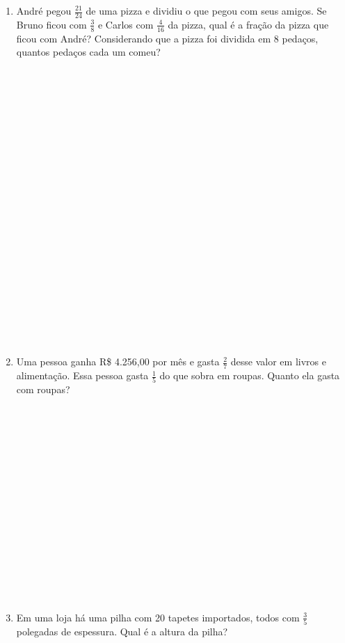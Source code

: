\documentclass[a4paper,14pt]{article}
\begin{document}
\begin{multicols}{2}
\begin{enumerate}
    		\item André pegou $\frac{21}{24}$ de uma pizza e dividiu o que pegou com seus amigos. Se Bruno ficou com $\frac{3}{8}$ e Carlos com $\frac{4}{16}$ da pizza, qual é a fração da pizza que ficou com André? Considerando que a pizza foi dividida em 8 pedaços, quantos pedaços cada um comeu? \\\\\\\\\\\\\\\\\\\\\\\\\\\\\\\\\\\\\\\\\\\\
   			\item Uma pessoa ganha R\$ 4.256,00 por mês e gasta $\frac{2}{7}$ desse valor em livros e alimentação. Essa pessoa gasta $\frac{1}{5}$ do que sobra em roupas. Quanto ela gasta com roupas? \\\\\\\\\\\\\\\\\\\\\\\\\\\\\\\\
   			\item Em uma loja há uma pilha com 20 tapetes importados, todos com $\frac{3}{5}$ polegadas de espessura. Qual é a altura da pilha? \\\\\\\\\\\\\\\\\\\\\\\\\\\\

\end{enumerate}
\end{multicols}
\end{document}
